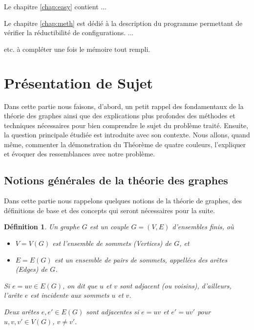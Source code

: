 \documentclass[10pt,a4paper]{article}
\newtheorem{definition}{Définition}
\begin{document}
Le chapitre \ref{chap:easy} contient ...

Le chapitre \ref{chap:meth} est dédié à la description du programme permettant de vérifier la réductibilité de configurations. ... 


etc. 
à compléter une fois le mémoire tout rempli.


\section{Présentation de Sujet}
\label{chap:pres}

Dans cette partie nous faisons, d'abord, un petit rappel des fondamentaux de la théorie des graphes ainsi que des explications plus profondes des méthodes et techniques nécessaires pour bien comprendre le sujet du problème traité. 
Ensuite, la question principale étudiée est introduite avec son contexte.
Nous allons, quand même, commenter la démonstration du Théorème de quatre couleurs, l'expliquer et évoquer des ressemblances avec notre problème. 

\subsection{Notions générales de la théorie des graphes}

Dans cette partie nous rappelons quelques notions de la théorie de graphes,  des définitions de base et des concepts qui seront nécessaires pour la suite. 

\begin{definition}
Un \emph{graphe} $G$ est un couple $G = (V,E)$ d'ensembles finis, où 
\begin{itemize}
\item $V=V(G)$ est l'ensemble de \emph{sommets (Vertices)} de $G$, et
\item $E=E(G)$ est un ensemble de pairs de sommets, appellées des \emph{arêtes (Edges)} de $G$.
\end{itemize}
Si $e = uv \in E(G)$, on dit que $u$ et $v$ sont \emph{adjacent} (ou \emph{voisins}), d'ailleurs, l'arête $e$ est \emph{incidente} aux sommets $u$ et $v$.

Deux arêtes $e,e'\in E(G)$ sont \emph{adjacentes} si $e=uv$ et $e'=uv'$ pour $u,v,v'\in V(G)$, $v\ne v'$.
\end{definition}
\end{document}
